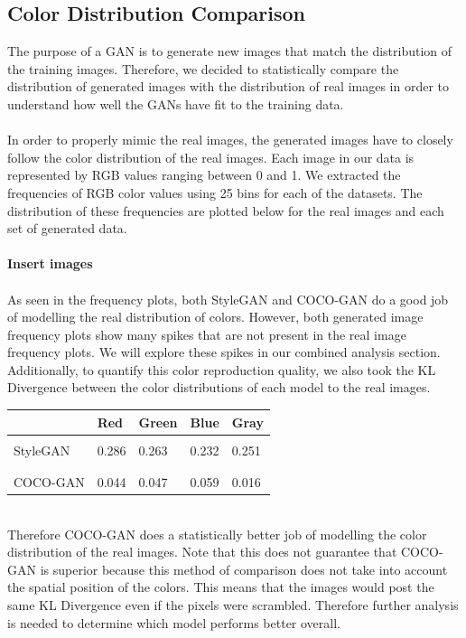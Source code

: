 \documentclass[12pt]{article}
\begin{document}
\begin{multicols*}{2}
        \subsection{Color Distribution Comparison}
        \label{subsec:colorDistribution}

        The purpose of a GAN is to generate new images that match the distribution of the training images. Therefore, we decided to statistically compare the distribution of generated images with the distribution of real images in order to understand how well the GANs have fit to the training data.
        \\\\
        In order to properly mimic the real images, the generated images have to closely follow the color distribution of the real images. Each image in our data is represented by RGB values ranging between 0 and 1. We extracted the frequencies of RGB color values using 25 bins for each of the datasets. The distribution of these frequencies are plotted below for the real images and each set of generated data.
        \\\\
        \textbf{Insert images}
        \\\\
        As seen in the frequency plots, both StyleGAN and COCO-GAN do a good job of modelling the real distribution of colors. However, both generated image frequency plots show many spikes that are not present in the real image frequency plots. We will explore these spikes in our combined analysis section. Additionally, to quantify this color reproduction quality, we also took the KL Divergence between the color distributions of each model to the real images. \\
        \begin{table}[h]
        \centering
        \begin{tabular}{lllll}
                 & Red & Green & Blue & Gray \\ \hline \\
        StyleGAN & 0.286    & 0.263      & 0.232     &  0.251    \\ \\ \hline \\
        COCO-GAN  & 0.044    & 0.047      & 0.059     &  0.016
        \end{tabular}
        \end{table}
        \\
        Therefore COCO-GAN does a statistically better job of modelling the color distribution of the real images. Note that this does not guarantee that COCO-GAN is superior because this method of comparison does not take into account the spatial position of the colors. This means that the images would post the same KL Divergence even if the pixels were scrambled. Therefore further analysis is needed to determine which model performs better overall.



\end{multicols*}
\end{document}
